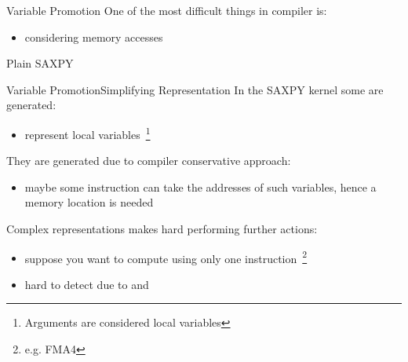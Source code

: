 \documentclass[10pt,mathserif]{beamer}
\begin{document}
\begin{frame}{Variable Promotion}
One of the most difficult things in compiler is:

\begin{itemize}
\item considering memory accesses
\end{itemize}

\vfill
\begin{block}{Plain SAXPY}
\centering
{}
\end{block}
\end{frame}

\begin{frame}{Variable Promotion}{Simplifying Representation}
In the SAXPY kernel some  are generated:

\begin{itemize}
\item represent \alert{local variables}~\footnote{Arguments are considered local variables}
\end{itemize}

\vfill
They are generated due to compiler \alert{conservative} approach:

\begin{itemize}
\item maybe some instruction can take the addresses of such variables, hence a
      memory location is needed
\end{itemize}

\vfill
Complex representations makes hard performing further actions:

\begin{itemize}
\item suppose you want to compute  using only one
      instruction~\footnote{e.g. FMA4}
\item hard to detect due to  and 
\end{itemize}
\end{frame}
\end{document}
